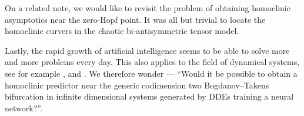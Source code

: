 On a related note, we would like to revisit the problem of obtaining homoclinic
asymptotics near the zero-Hopf point. It was all but trivial to locate the
homoclinic curvers in the chaotic bi-antisymmetric tensor model.

Lastly, the rapid growth of artificial intelligence seems to be able to solve
more and more problems every day. This also applies to the field of dynamical
systems, see for example \cite{Ghadami2022}, and
\cite{631606893d774be2a2c919789d14b2d6}. We therefore wonder --- ``Would it be
possible to obtain a homoclinic predictor near the generic codimension two
Bogdanov--Takens bifurcation in infinite dimensional systems generated by DDEs
training a neural network?''.
